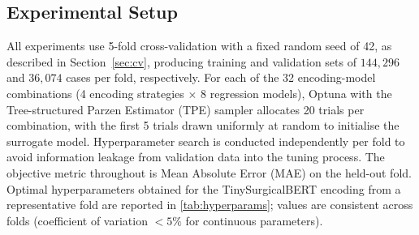 \documentclass[3p]{elsarticle}
\begin{document}
\subsection{Experimental Setup}
\label{sec:exp_setup}

All experiments use 5-fold cross-validation with a fixed random seed of 42, as described in Section~\ref{sec:cv}, producing training and validation sets of $144{,}296$ and $36{,}074$ cases per fold, respectively. For each of the 32 encoding-model combinations (4 encoding strategies $\times$ 8 regression models), Optuna with the Tree-structured Parzen Estimator (TPE) sampler allocates 20 trials per combination, with the first 5 trials drawn uniformly at random to initialise the surrogate model. Hyperparameter search is conducted independently per fold to avoid information leakage from validation data into the tuning process. The objective metric throughout is Mean Absolute Error (MAE) on the held-out fold. Optimal hyperparameters obtained for the TinySurgicalBERT encoding from a representative fold are reported in \cref{tab:hyperparams}; values are consistent across folds (coefficient of variation $< 5\%$ for continuous parameters).
\end{document}
